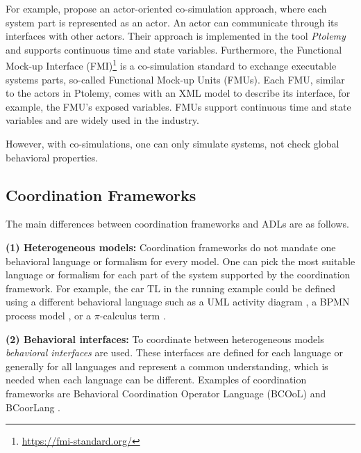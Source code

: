 \documentclass[runningheads]{llncs}
\begin{document}
For example, \cite{ekerTamingHeterogeneityPtolemy2003} propose an actor-oriented co-simulation approach, where each system part is represented as an actor.
An actor can communicate through its interfaces with other actors.
Their approach is implemented in the tool \textit{Ptolemy} and supports continuous time and state variables.
Furthermore, the Functional Mock-up Interface (FMI)\footnote{\url{https://fmi-standard.org/}} is a co-simulation standard to exchange executable systems parts, so-called Functional Mock-up Units (FMUs).
Each FMU, similar to the actors in Ptolemy, comes with an XML model to describe its interface, for example, the FMU's exposed variables.
FMUs support continuous time and state variables and are widely used in the industry.

However, with co-simulations, one can only simulate systems, not check global behavioral properties.

\subsection{Coordination Frameworks} \label{subsec:frameworks}

The main differences between coordination frameworks and ADLs are as follows.

\textbf{(1) Heterogeneous models:} Coordination frameworks do not mandate one behavioral language or formalism for every model.
One can pick the most suitable language or formalism for each part of the system supported by the coordination framework.
For example, the car TL in the running example could be defined using a different behavioral language such as a UML activity diagram \cite{objectmanagementgroupUnifiedModelingLanguage2017}, a BPMN process model \cite{objectmanagementgroupBusinessProcessModel2013}, or a $\pi$-calculus term \cite{milnerCommunicatingMobileSystems2010}.

\textbf{(2) Behavioral interfaces:} To coordinate between heterogeneous models \textit{behavioral interfaces} are used.
These interfaces are defined for each language or generally for all languages and represent a common understanding, which is needed when each language can be different.
Examples of coordination frameworks are Behavioral Coordination Operator Language (BCOoL) \cite{varalarsenBCOolBehavioralCoordination2016,varalarsenBehavioralCoordinationOperator2015} and BCoorLang \cite{krauterBehavioralConsistencyMultimodeling2023}.
\end{document}
